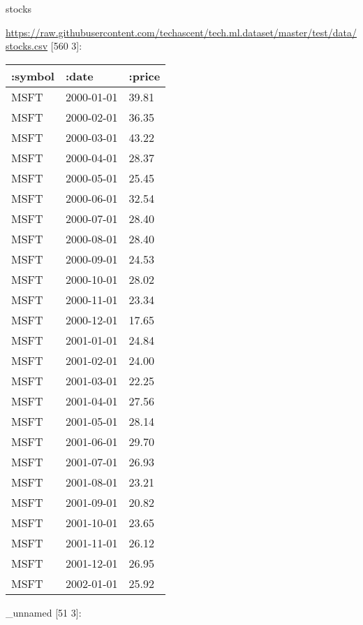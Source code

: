 \documentclass[]{article}
\newenvironment{Shaded}{\begin{snugshade}}{\end{snugshade}}
\newcommand{\KeywordTok}[1]{\textcolor[rgb]{0.13,0.29,0.53}{\textbf{#1}}}
\newcommand{\VariableTok}[1]{\textcolor[rgb]{0.00,0.00,0.00}{#1}}
\newcommand{\AttributeTok}[1]{\textcolor[rgb]{0.77,0.63,0.00}{#1}}
\newcommand{\NormalTok}[1]{#1}
\begin{document}
\begin{Shaded}
\begin{Highlighting}[]
\NormalTok{stocks}
\end{Highlighting}
\end{Shaded}

\url{https://raw.githubusercontent.com/techascent/tech.ml.dataset/master/test/data/stocks.csv}
{[}560 3{]}:

\begin{longtable}[]{@{}lll@{}}
\toprule
:symbol & :date & :price\tabularnewline
\midrule
\endhead
MSFT & 2000-01-01 & 39.81\tabularnewline
MSFT & 2000-02-01 & 36.35\tabularnewline
MSFT & 2000-03-01 & 43.22\tabularnewline
MSFT & 2000-04-01 & 28.37\tabularnewline
MSFT & 2000-05-01 & 25.45\tabularnewline
MSFT & 2000-06-01 & 32.54\tabularnewline
MSFT & 2000-07-01 & 28.40\tabularnewline
MSFT & 2000-08-01 & 28.40\tabularnewline
MSFT & 2000-09-01 & 24.53\tabularnewline
MSFT & 2000-10-01 & 28.02\tabularnewline
MSFT & 2000-11-01 & 23.34\tabularnewline
MSFT & 2000-12-01 & 17.65\tabularnewline
MSFT & 2001-01-01 & 24.84\tabularnewline
MSFT & 2001-02-01 & 24.00\tabularnewline
MSFT & 2001-03-01 & 22.25\tabularnewline
MSFT & 2001-04-01 & 27.56\tabularnewline
MSFT & 2001-05-01 & 28.14\tabularnewline
MSFT & 2001-06-01 & 29.70\tabularnewline
MSFT & 2001-07-01 & 26.93\tabularnewline
MSFT & 2001-08-01 & 23.21\tabularnewline
MSFT & 2001-09-01 & 20.82\tabularnewline
MSFT & 2001-10-01 & 23.65\tabularnewline
MSFT & 2001-11-01 & 26.12\tabularnewline
MSFT & 2001-12-01 & 26.95\tabularnewline
MSFT & 2002-01-01 & 25.92\tabularnewline
\bottomrule
\end{longtable}

\begin{Shaded}
\end{Shaded}

\_unnamed {[}51 3{]}:
\end{document}
